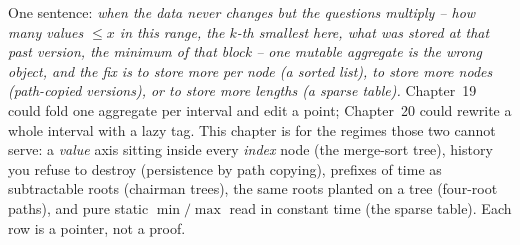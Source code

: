 

One sentence: \emph{when the data never changes but the questions multiply -- \emph{how
many values \(\le x\) in this range}, \emph{the \(k\)-th smallest here}, \emph{what was
stored at that past version}, \emph{the minimum of that block} -- one mutable aggregate
is the wrong object, and the fix is to store more per node (a sorted list), to store more
nodes (path-copied versions), or to store more lengths (a sparse table).} Chapter~19 could
fold one aggregate per interval and edit a point; Chapter~20 could rewrite a whole interval
with a lazy tag. This chapter is for the regimes those two cannot serve: a \emph{value} axis
sitting inside every \emph{index} node (the merge-sort tree), history you refuse to destroy
(persistence by path copying), prefixes of time as subtractable roots (chairman trees), the
same roots planted on a tree (four-root paths), and pure static \(\min/\max\) read in
constant time (the sparse table). Each row is a pointer, not a proof.

